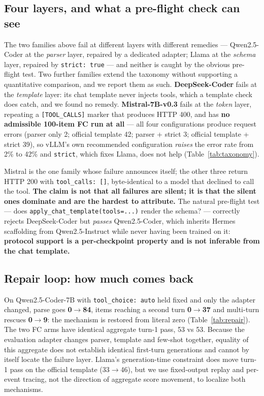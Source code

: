 \subsection{Four layers, and what a pre-flight check can see}
\label{sec:taxonomy}
\label{sec:families}

The two families above fail at different layers with different remedies --- Qwen2.5-Coder at the
\emph{parser} layer, repaired by a dedicated adapter; Llama at the \emph{schema} layer, repaired by
\texttt{strict: true} --- and neither is caught by the obvious pre-flight test. Two further
families extend the taxonomy without supporting a quantitative comparison, and we report them as
such. \textbf{DeepSeek-Coder} fails at the \emph{template} layer: its chat template never injects
tools, which a template check does catch, and we found no remedy. \textbf{Mistral-7B-v0.3} fails at
the \emph{token} layer, repeating a \texttt{[TOOL\_CALLS]} marker that produces HTTP 400, and has
\textbf{no admissible 100-item FC run at all} --- all four configurations produce request errors
(parser only 2; official template 42; parser + strict 3; official template + strict 39), so vLLM's
own recommended configuration \emph{raises} the error rate from 2\% to 42\% and \texttt{strict},
which fixes Llama, does not help (Table~\ref{tab:taxonomy}).

Mistral is the one family whose failure announces itself; the other three return HTTP 200 with
\texttt{tool\_calls: []}, byte-identical to a model that declined to call the tool. \textbf{The
claim is not that all failures are silent; it is that the silent ones dominate and are the hardest
to attribute.} The natural pre-flight test --- does \texttt{apply\_chat\_template(tools=...)}
render the schema? --- correctly rejects DeepSeek-Coder but \emph{passes} Qwen2.5-Coder, which
inherits Hermes scaffolding from Qwen2.5-Instruct while never having been trained on it:
\textbf{protocol support is a per-checkpoint property and is not inferable from the chat
template.}

\subsection{Repair loop: how much comes back}
\label{sec:repair}
\label{sec:maintable}

On Qwen2.5-Coder-7B with \texttt{tool\_choice: auto} held fixed and only the adapter changed,
parse goes \textbf{0$\to$84}, items reaching a second turn \textbf{0$\to$37} and multi-turn rescues
\textbf{0$\to$9}: the mechanism is restored from literal zero (Table~\ref{tab:repair}). The two FC
arms have identical aggregate turn-1 pass, 53 vs 53. Because the evaluation adapter changes
parser, template and few-shot together, equality of this aggregate does not establish identical
first-turn generations and cannot by itself locate the failure layer. Llama's generation-time
constraint does move turn-1 pass on the official template (33$\to$46), but we use fixed-output replay and per-event tracing,
not the direction of aggregate score movement, to localize both mechanisms.

